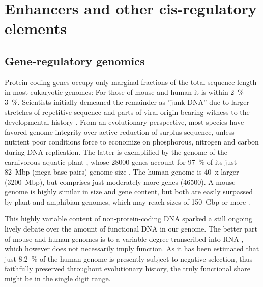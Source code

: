 \chapter{Enhancers and other cis-regulatory elements}
\minitoc

\section{Gene-regulatory genomics}
\label{chap:i:enhancers:regulatorygenomics}

Protein-coding genes occupy only marginal fractions of the total sequence length in most eukaryotic genomes\cite{bookshelf-eukaryotic-genomes}: For those of mouse and human it is within \SIrange{2}{3}{\percent}. Scientists initially demeaned the remainder as ''junk DNA'' due to larger stretches of repetitive sequence and parts of viral origin bearing witness to the developmental history \cite{Makalowski2000,Palazzo2014}. From an evolutionary perspective, most species have favored genome integrity over active reduction of surplus sequence, unless nutrient poor conditions force to economize on phosphorous, nitrogen and carbon during DNA replication. The latter is exemplified by the genome of the carnivorous aquatic plant , whose \num{28000} genes account for \SI{97}{\percent} of its just \SI{82}{\mega bp} (mega-base pairs) genome size \cite{Ibarra-Laclette2013,Carretero-Paulet2015}. The human genome is \SI{40}{x} larger (\SI{3200}{\mega bp}), but comprises just moderately more genes (\num{46500}). A mouse genome is highly similar in size and gene content, but both are easily surpassed by plant and amphibian genomes, which may reach sizes of \SI{150}{\giga bp} or more \cite{Dufresne2011}.

This highly variable content of non-protein-coding DNA sparked a still ongoing lively debate over the amount of functional DNA in our genome\cite{Graur2013,Doolittle2013,Niu2013}. The better part of mouse and human genomes is to a variable degree transcribed into RNA \cite{Carninci2005,Djebali2012}, which however does not necessarily imply function\cite{Palazzo2015}. As it has been estimated that just \SI{8.2}{\percent} of the human genome is presently subject to negative selection\cite{Rands2014}, thus faithfully preserved throughout evolutionary history, the truly functional share might be in the single digit range. 

